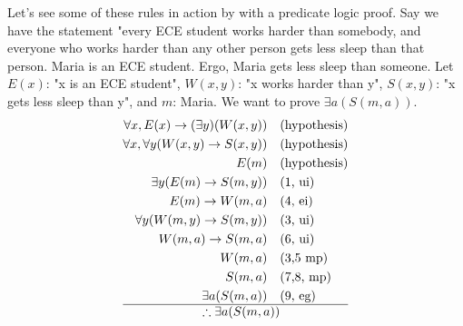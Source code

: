 \documentclass[nobib]{tufte-handout}
\begin{document}
Let's see some of these rules in action by with a predicate logic proof.
Say we have the statement "every ECE student works harder
than somebody, and everyone who works harder than any other
person gets less sleep than that person. Maria is an 
ECE student. Ergo, Maria gets less sleep than someone. 
Let $E(x)$: "x is an ECE student", $W(x,y)$: "x works harder than y", 
$S(x,y)$: "x gets less sleep than y", and $m$: Maria. 
We want to prove $\exists a (S(m,a))$. 
\begin{align*}
    \forall x, E(x) \rightarrow (\exists y) (W(x,y)) \quad &\text{(hypothesis)}\\
    \forall x, \forall y (W(x,y) \rightarrow S(x,y)) \quad &\text{(hypothesis)}\\
    E(m) \quad &\text{(hypothesis)}\\
    \exists y (E(m) \rightarrow S(m,y)) \quad &\text{(1, ui)}\\
    E(m) \rightarrow W(m,a) \quad &\text{(4, ei)}\\
    \forall y (W(m,y) \rightarrow S(m,y)) \quad &\text{(3, ui)}\\
    W(m,a) \rightarrow S(m,a) \quad &\text{(6, ui)}\\
    W(m,a) \quad &\text{(3,5 mp)}\\
    S(m,a) \quad &\text{(7,8, mp)}\\
    \exists a (S(m,a)) \quad &\text{(9, eg)}\\
    \hline
    \therefore \exists a (S(m,a)) \notag
\end{align*}
\pagebreak 
\end{document}
